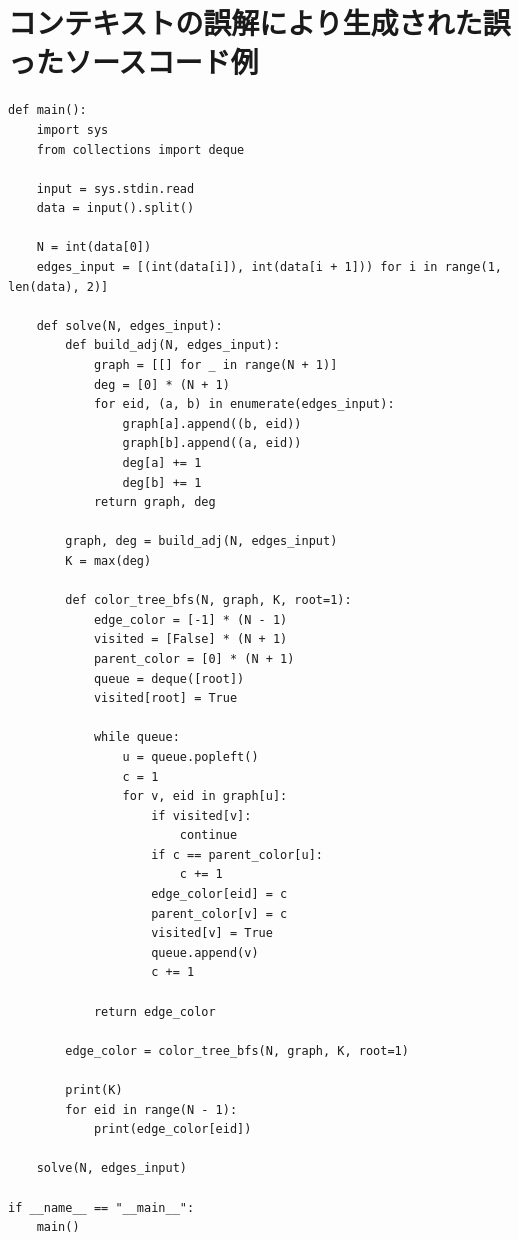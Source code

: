 \documentclass[11pt]{jreport}
\begin{document}
\section{コンテキストの誤解により生成された誤ったソースコード例}
\label{mistake_code}
\begin{Verbatim}[breaklines=true,breakanywhere=true]
def main():
    import sys
    from collections import deque

    input = sys.stdin.read
    data = input().split()
    
    N = int(data[0])
    edges_input = [(int(data[i]), int(data[i + 1])) for i in range(1, len(data), 2)]

    def solve(N, edges_input):
        def build_adj(N, edges_input):
            graph = [[] for _ in range(N + 1)]
            deg = [0] * (N + 1)
            for eid, (a, b) in enumerate(edges_input):
                graph[a].append((b, eid))
                graph[b].append((a, eid))
                deg[a] += 1
                deg[b] += 1
            return graph, deg

        graph, deg = build_adj(N, edges_input)
        K = max(deg)

        def color_tree_bfs(N, graph, K, root=1):
            edge_color = [-1] * (N - 1)
            visited = [False] * (N + 1)
            parent_color = [0] * (N + 1)
            queue = deque([root])
            visited[root] = True

            while queue:
                u = queue.popleft()
                c = 1
                for v, eid in graph[u]:
                    if visited[v]:
                        continue
                    if c == parent_color[u]:
                        c += 1
                    edge_color[eid] = c
                    parent_color[v] = c
                    visited[v] = True
                    queue.append(v)
                    c += 1

            return edge_color

        edge_color = color_tree_bfs(N, graph, K, root=1)

        print(K)
        for eid in range(N - 1):
            print(edge_color[eid])

    solve(N, edges_input)

if __name__ == "__main__":
    main()
\end{Verbatim}


\end{document}
